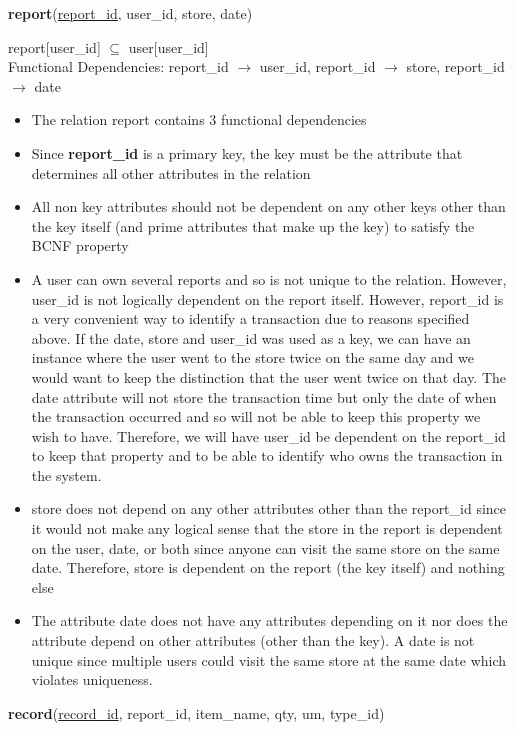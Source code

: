 \documentclass{article}
\begin{document}
\textbf{report}(\underline{report\_id}, user\_id, store, date)

report[user\_id] $\subseteq$ user[user\_id]
\\

Functional Dependencies: report\_id $\to$ user\_id, report\_id $\to$ store, report\_id $\to$ date

\begin{itemize}
    \item The relation report contains 3 functional dependencies
    \item Since \textbf{report\_id} is a primary key, the key must be the attribute that determines all other attributes in the relation
    \item All non key attributes should not be dependent on any other keys other than the key itself (and prime attributes that make up the key) to satisfy the BCNF property
    \item A user can own several reports and so is not unique to the relation. However, user\_id is not logically dependent on the report itself. However, report\_id is a very convenient way to identify a transaction due to reasons specified above. If the date, store and user\_id was used as a key, we can have an instance where the user went to the store twice on the same day and we would want to keep the distinction that the user went twice on that day. The date attribute will not store the transaction time but only the date of when the transaction occurred and so will not be able to keep this property we wish to have. Therefore, we will have user\_id be dependent on the report\_id to keep that property and to be able to identify who owns the transaction in the system.
    \item store does not depend on any other attributes other than the report\_id since it would not make any logical sense that the store in the report is dependent on the user, date, or both since anyone can visit the same store on the same date. Therefore, store is dependent on the report (the key itself) and nothing else
    \item The attribute date does not have any attributes depending on it nor does the attribute depend on other attributes (other than the key). A date is not unique since multiple users could visit the same store at the same date which violates uniqueness.
\end{itemize}

\textbf{record}(\underline{record\_id}, report\_id, item\_name, qty, um, type\_id)
\end{document}
